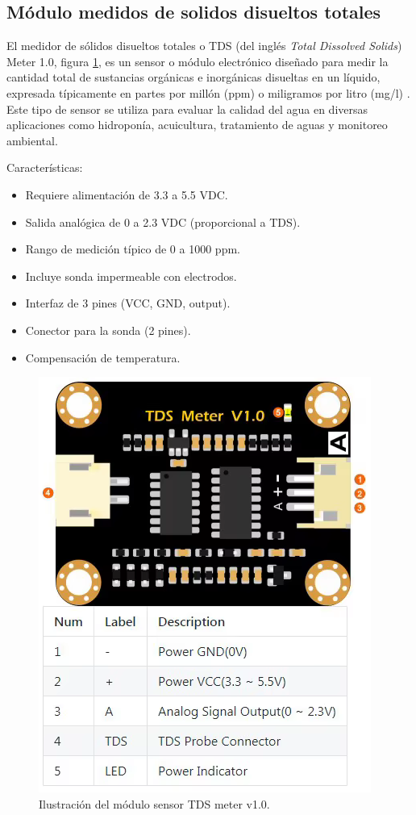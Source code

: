 
\subsection{Módulo medidos de solidos disueltos totales}

El medidor de sólidos disueltos totales o TDS (del inglés \textit{Total Dissolved Solids}) Meter 1.0, figura \ref{fig:tds}, es un sensor o módulo electrónico diseñado para medir la cantidad total de sustancias orgánicas e inorgánicas disueltas en un líquido, expresada típicamente en partes por millón (ppm) o miligramos por litro (mg/l) \cite{TDS}. Este tipo de sensor se utiliza para evaluar la calidad del agua en diversas aplicaciones como hidroponía, acuicultura, tratamiento de aguas y monitoreo ambiental.

Características:

\begin{itemize}
	\item Requiere alimentación de 3.3 a 5.5 VDC.
	\item Salida analógica de 0 a 2.3 VDC (proporcional a TDS).
	\item Rango de medición típico de 0 a 1000 ppm.
	\item Incluye sonda impermeable con electrodos.
	\item Interfaz de 3 pines (VCC, GND, output).
	\item Conector para la sonda (2 pines).
	\item Compensación de temperatura.
\end{itemize}


\begin{figure}[h]
\centering
\includegraphics[scale=.5]{./Figures/tds.png}
	\caption{Ilustración del módulo sensor TDS meter v1.0\protect\footnotemark.}
	\label{fig:tds}
\end{figure}

